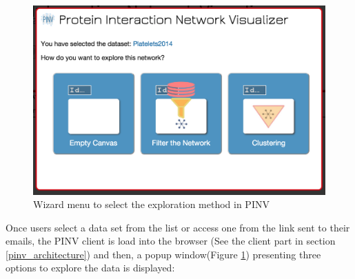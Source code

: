 \begin{figure}[ht]
\centering
\includegraphics[width=\textwidth]{figures/pinv_wizard.png}
\caption[Wizard menu to select the exploration method in PINV]{Wizard menu to select the exploration method in PINV
\label{fig:pinv_wizard}}
\end{figure}

Once users select a data set from the list or access one from the link sent to their emails, the PINV client is load into the browser (See the client part in section \ref{pinv_architecture}) and then, a popup window(Figure \ref{fig:pinv_wizard}) presenting three options to explore the data is displayed:

